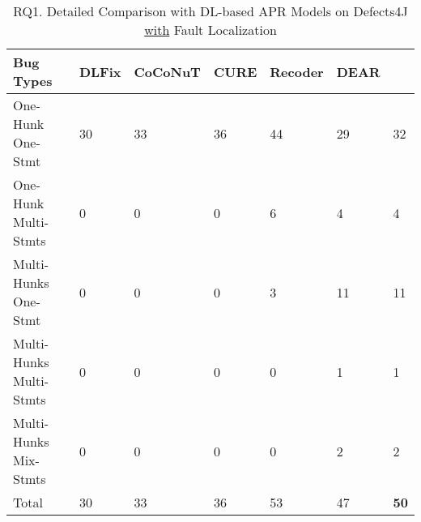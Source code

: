 \begin{table}
	\caption{RQ1. Detailed Comparison with DL-based APR Models on Defects4J \underline{with} Fault Localization}
	\vspace{-10pt}
	\begin{center}
        \small
          \tabcolsep 2.5pt
		\renewcommand{\arraystretch}{1} 
\begin{tabular}{p{2.9cm}<{\centering}|p{0.7cm}<{\centering}|p{1.1cm}<{\centering}|p{0.6cm}<{\centering}|p{0.8cm}<{\centering}|p{0.7cm}<{\centering}|p{0.7cm}}
			\hline
			Bug Types & DLFix& CoCoNuT & CURE & Recoder & DEAR & {\tool}\\\hline
			
			One-Hunk One-Stmt  & 30 & 33 & 36 & 44 & 29 & 32\\
			One-Hunk Multi-Stmts  & 0 &0 & 0 & 6 & 4 & 4\\ 
			Multi-Hunks One-Stmt  & 0 &0 & 0 & 3 & 11 &  11\\
			Multi-Hunks Multi-Stmts  & 0 &0 & 0 & 0 & 1 & 1\\
			Multi-Hunks Mix-Stmts  & 0 & 0 & 0 & 0 & 2 & 2\\\hline
			Total & 30 & 33 & 36 & 53 & 47 & {\bf 50}\\
			\hline
		\end{tabular}
		\label{multi-tab-with-FL}
	\end{center}
\vspace{-3pt}
\end{table}
















